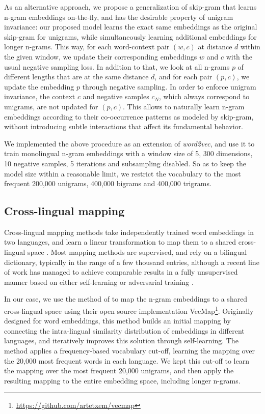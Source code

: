 \documentclass[11pt,a4paper]{article}
\begin{document}
As an alternative approach, we propose a generalization of skip-gram that learns n-gram embeddings on-the-fly, and has the desirable property of unigram invariance: our proposed model learns the exact same embeddings as the original skip-gram for unigrams, while simultaneously learning additional embeddings for longer n-grams. This way, for each word-context pair $(w,c)$ at distance $d$ within the given window, we update their corresponding embeddings $w$ and $c$ with the usual negative sampling loss. In addition to that, we look at all n-grams $p$ of different lengths that are at the same distance $d$, and for each pair $(p,c)$, we update the embedding $p$ through negative sampling. In order to enforce unigram invariance, the context $c$ and negative samples $c_N$, which always correspond to unigrams, are not updated for $(p,c)$. This allows to naturally learn n-gram embeddings according to their co-occurrence patterns as modeled by skip-gram, without introducing subtle interactions that affect its fundamental behavior.

We implemented the above procedure as an extension of \textit{word2vec}, and use it to train monolingual n-gram embeddings with a window size of 5, 300 dimensions, 10 negative samples, 5 iterations and subsampling disabled. So as to keep the model size within a reasonable limit, we restrict the vocabulary to the most frequent 200,000 unigrams, 400,000 bigrams and 400,000 trigrams.


\subsection{Cross-lingual mapping} \label{subsec:mapping}

Cross-lingual mapping methods take independently trained word embeddings in two languages, and learn a linear transformation to map them to a shared cross-lingual space \citep{mikolov2013exploiting,artetxe2018generalizing}. Most mapping methods are supervised, and rely on a bilingual dictionary, typically in the range of a few thousand entries, although a recent line of work has managed to achieve comparable results in a fully unsupervised manner based on either self-learning \citep{artetxe2017learning,artetxe2018robust} or adversarial training \citep{zhang2017adversarial,zhang2017earth,conneau2018word}.

In our case, we use the method of \citet{artetxe2018robust} to map the n-gram embeddings to a shared cross-lingual space using their open source implementation VecMap\footnote{\url{https://github.com/artetxem/vecmap}}. Originally designed for word embeddings, this method builds an initial mapping by connecting the intra-lingual similarity distribution of embeddings in different languages, and iteratively improves this solution through self-learning. The method applies a frequency-based vocabulary cut-off, learning the mapping over the 20,000 most frequent words in each language. We kept this cut-off to learn the mapping over the most frequent 20,000 unigrams, and then apply the resulting mapping to the entire embedding space, including longer n-grams.
\end{document}
